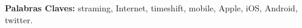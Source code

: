  




\textbf{Palabras Claves:} straming, Internet, timeshift, mobile, Apple, iOS, Android, twitter.


